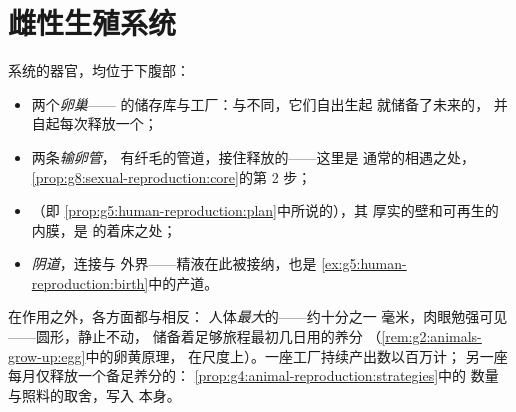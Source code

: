 \section{雌性生殖系统}

\begin{definition}[雌性生殖系统]\label{def:g8:reproductive-systems:female}
系统的器官，均位于下腹部：
\begin{itemize}
  \item 两个\emph{卵巢}——
        的储存库与工厂：与不同，它们自出生起
        就储备了未来的\emph{}，
        并自起每次释放一个；
  \item 两条\emph{输卵管}，
        有纤毛的管道，接住释放的——这里是
        通常的相遇之处，
        \cref{prop:g8:sexual-reproduction:core}的第 2 步；
  \item \emph{}（即
        \cref{prop:g5:human-reproduction:plan}中所说的），其
        厚实的壁和可再生的内膜，是
        的着床之处；
  \item \emph{阴道}，连接与
        外界——精液在此被接纳，也是
        \cref{ex:g5:human-reproduction:birth}中的产道。
\end{itemize}
\end{definition}

\begin{example}[近看卵细胞]\label{ex:g8:reproductive-systems:egg}
在作用之外，各方面都与相反：
人体\emph{最大}的——约十分之一
毫米，肉眼勉强可见——圆形，静止不动，
储备着足够旅程最初几日用的养分
（\cref{rem:g2:animals-grow-up:egg}中的卵黄原理，
在尺度上）。一座工厂持续产出数以百万计；
另一座每月仅释放一个备足养分的：
\cref{prop:g4:animal-reproduction:strategies}中的
数量与照料的取舍，写入
本身。
\end{example}

